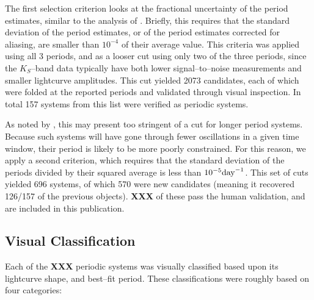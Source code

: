 \documentclass[]{emulateapj}
\begin{document}
The first selection criterion looks at the fractional uncertainty of
the period estimates, similar to the analysis of
\cite{becker2011}.  Briefly, this requires that the standard
deviation of the period estimates, or of the period estimates
corrected for aliasing, are smaller than $10^{-4}$ of their average
value. This criteria was applied using all 3 periods, and as a looser
cut using only two of the three periods, since the $K_S$--band data
typically have both lower signal--to--noise measurements and smaller
lightcurve amplitudes.  This cut yielded 2073 candidates, each of
which were folded at the reported periods and validated through visual
inspection.  In total 157 systems from this list were verified as
periodic systems.

As noted by \cite{oluseyi2012}, this may present too stringent
of a cut for longer period systems.  Because such systems will have
gone through fewer oscillations in a given time window, their period
is likely to be more poorly constrained.  For this reason, we apply a
second criterion, which requires that the standard deviation of the
periods divided by their squared average is less than $10^{-5} {\rm
  day}^{-1}$.  This set of cuts yielded 696 systems, of which 570 were
new candidates (meaning it recovered 126/157 of the previous objects).
{\bf XXX} of these pass the human validation, and are included in this
publication.



\subsection{Visual Classification}
Each of the {\bf XXX} periodic systems was visually classified based
upon its lightcurve shape, and best--fit period.  These classifications
were roughly based on four categories:
\end{document}
